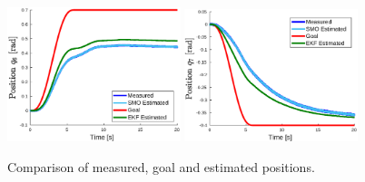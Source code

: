 \documentclass[smallextended]{svjour3}       %
\begin{document}
\begin{figure}
  \includegraphics[width=0.45\textwidth]{Figures/result_q6.eps}
  \includegraphics[width=0.45\textwidth]{Figures/result_q7.eps}
  \caption{Comparison of measured, goal and estimated positions.}
  \label{fig:result_q}
\end{figure}
\end{document}
